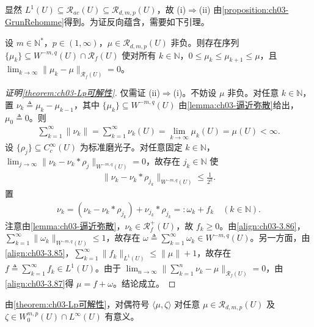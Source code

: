 \documentclass[../../main.tex]{subfiles}%
\begin{document}
显然 $L^1(U)\subseteq\mathscr{R}_{ac}(U)\subseteq\mathscr{R}_{d,m,p}(U)$，故 (i)$\Rightarrow$(ii) 由\cref{proposition:ch03-GrunRehomme}得到。为证反向蕴含，需要如下引理。

\begin{lemma}\label{lemma:ch03-逼近弥散}
设 $m\in\mathbb{N}^*$，$p\in(1,\infty)$，$\mu\in\mathscr{R}_{d,m,p}(U)$ 非负。则存在序列 $\{\mu_k\}\subseteq W^{-m,q}(U)\cap\mathscr{R}_f(U)$ 使对所有 $k\in\mathbb{N}$，$0\leqslant\mu_k\leqslant\mu_{k+1}\leqslant\mu$，且 $\lim_{k\to\infty}\|\mu_k-\mu\|_{\mathscr{R}_f(U)}=0$。
\end{lemma}

\begin{proof}[证明\cref{theorem:ch03-Lp可解性}]
仅需证 (ii)$\Rightarrow$(i)。不妨设 $\mu$ 非负。对任意 $k\in\mathbb{N}$，置 $\nu_k\triangleq \mu_k-\mu_{k-1}$，其中 $\{\mu_k\}\subseteq W^{-m,q}(U)$ 由\cref{lemma:ch03-逼近弥散}给出，$\mu_0\triangleq 0$。则
\begin{align}
\sum_{k=1}^\infty\|\nu_k\|=\sum_{k=1}^\infty\nu_k(U)=\lim_{k\to\infty}\mu_k(U)=\mu(U)<\infty.\label{align:ch03-3.85}
\end{align}
设 $\{\rho_j\}\subseteq C^\infty_c(U)$ 为标准磨光子。对任意固定 $k\in\mathbb{N}$，$\lim_{j\to\infty}\|\nu_k-\nu_k*\rho_j\|_{W^{-m,q}(U)}=0$，故存在 $j_k\in\mathbb{N}$ 使
\begin{align}
\|\nu_k-\nu_k*\rho_{j_k}\|_{W^{-m,q}(U)}\leqslant\frac{1}{2^k}.\label{align:ch03-3.86}
\end{align}
置
\begin{align}
\nu_k=(\nu_k-\nu_k*\rho_{j_k})+\nu_{j_k}*\rho_{j_k}=:\omega_k+f_k\quad (k\in\mathbb{N}).\label{align:ch03-3.87}
\end{align}
注意由\cref{lemma:ch03-逼近弥散}，$\nu_k\in\mathscr{R}^+_f(U)$，故 $f_k\geqslant0$。由\eqref{align:ch03-3.86}，$\sum_{k=1}^\infty\|\omega_k\|_{W^{-m,q}(U)}\leqslant1$，故存在 $\omega\triangleq \sum_{k=1}^\infty\omega_k\in W^{-m,q}(U)$。另一方面，由\eqref{align:ch03-3.85}，$\sum_{k=1}^\infty\|f_k\|_{L^1(U)}\leqslant\|\mu\|+1$，故存在 $f\triangleq \sum_{k=1}^\infty f_k\in L^1(U)$。由于 $\lim_{n\to\infty}\|\sum_{k=1}^n\nu_k-\mu\|_{\mathscr{R}_f(U)}=0$，由\eqref{align:ch03-3.87}得 $\mu=f+\omega$。结论成立。
\end{proof}

\begin{remark}\label{remark:ch03-对偶意义}
由\cref{theorem:ch03-Lp可解性}，对偶符号 $\langle\mu,\zeta\rangle$ 对任意 $\mu\in\mathscr{R}_{d,m,p}(U)$ 及 $\zeta\in W^{m,p}_0(U)\cap L^\infty(U)$ 有意义。
\end{remark}
\end{document}
